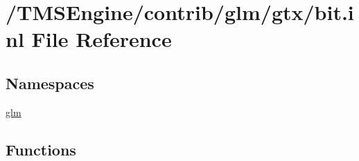 \hypertarget{bit_8inl}{}\section{/\+T\+M\+S\+Engine/contrib/glm/gtx/bit.inl File Reference}
\label{bit_8inl}
\subsection*{Namespaces}
\begin{DoxyCompactItemize}
\item 
 \hyperlink{namespaceglm}{glm}
\end{DoxyCompactItemize}
\subsection*{Functions}

